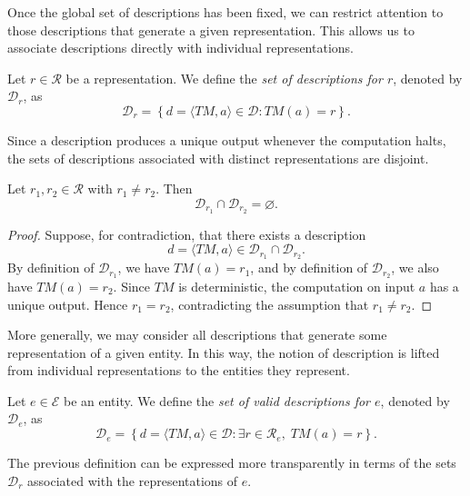 Once the global set of descriptions has been fixed, we can restrict attention to those descriptions that generate a given representation. This allows us to associate descriptions directly with individual representations.

\begin{definition}
\label{def:descriptions_for_representation}
Let $r \in \mathcal{R}$ be a representation. We define the \emph{set of descriptions for $r$}, denoted by $\mathcal{D}_r$, as
\[
\mathcal{D}_r = \left\{ d=\langle TM,a\rangle \in \mathcal{D} : TM(a)=r \right\}.
\]
\end{definition}

Since a description produces a unique output whenever the computation halts, the sets of descriptions associated with distinct representations are disjoint.

\begin{proposition}
\label{prop:disjoint_descriptions_of_representations}
Let $r_1,r_2 \in \mathcal{R}$ with $r_1 \neq r_2$. Then
\[
\mathcal{D}_{r_1}\cap \mathcal{D}_{r_2}=\varnothing.
\]
\end{proposition}
\begin{proof}
Suppose, for contradiction, that there exists a description
\[
d=\langle TM,a\rangle \in \mathcal{D}_{r_1}\cap \mathcal{D}_{r_2}.
\]
By definition of $\mathcal{D}_{r_1}$, we have $TM(a)=r_1$, and by definition of $\mathcal{D}_{r_2}$, we also have $TM(a)=r_2$. Since $TM$ is deterministic, the computation on input $a$ has a unique output. Hence $r_1=r_2$, contradicting the assumption that $r_1\neq r_2$.
\end{proof}

More generally, we may consider all descriptions that generate some representation of a given entity. In this way, the notion of description is lifted from individual representations to the entities they represent.

\begin{definition}
\label{def:descriptions_for_entity}
Let $e \in \mathcal{E}$ be an entity. We define the \emph{set of valid descriptions for $e$}, denoted by $\mathcal{D}_e$, as
\[
\mathcal{D}_e = \left\{ d=\langle TM,a\rangle \in \mathcal{D} : \exists r \in \mathcal{R}_e,\; TM(a)=r \right\}.
\]
\end{definition}

The previous definition can be expressed more transparently in terms of the sets $\mathcal{D}_r$ associated with the representations of $e$.

